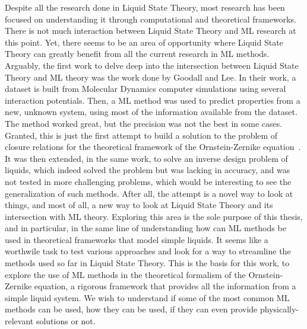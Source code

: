 Despite all the research done in Liquid State Theory, most research has been focused on
understanding it through computational and theoretical frameworks. There is not much
interaction between Liquid State Theory and ML research at this point.
Yet, there seems to be an area of opportunity where Liquid State Theory can greatly
benefit from all the current research in ML methods. Arguably, the first work to delve deep 
into the intersection between Liquid State Theory and ML theory was the work done by
Goodall and Lee.
In their work, a dataset is built from Molecular Dynamics computer simulations using several
interaction potentials. Then, a ML method was used to predict properties from a new,
unknown system, using most of the information available from the dataset.
The method worked great, but the precision was not the best in some cases. Granted, this
is just the first attempt to build a solution to the problem of closure relations
for the theoretical framework of the Ornstein-Zernike equation~\cite{hansenTheorySimpleLiquids2013}.
It was then extended, in the same work, to solve an inverse design problem of liquids, 
which indeed solved the problem but was lacking in accuracy, and was not tested in
more challenging problems, which would be interesting to see the generalization of
such methods.
After all, the attempt is a novel way to look at things, and most of all, a new way to
look at Liquid State Theory and its intersection with ML theory.
Exploring this area is the sole purpose of this thesis, and in particular, in the same
line of understanding how can ML methods be used in theoretical frameworks that model
simple liquids. It seems like a worthwile task to test various approaches and look for a
way to streamline the methods used so far in Liquid State Theory. This is the basis for
this work, to explore the use of ML methods in the theoretical formalism of the
Ornstein-Zernike equation, a rigorous framework that provides all the information from
a simple liquid system. We wish to understand if some of the most common ML methods
can be used, how they can be used, if they can even provide physically-relevant
solutions or not.

